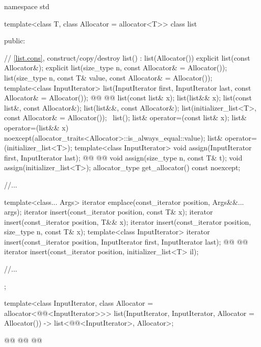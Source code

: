 \documentclass{wg21}
\begin{document}
\begin{codeblock}
namespace std {
    template<class T, class Allocator = allocator<T>>
    class list {
        public:

        // \ref{list.cons}, construct/copy/destroy
        list() : list(Allocator()) { }
        explicit list(const Allocator&);
        explicit list(size_type n, const Allocator& = Allocator());
        list(size_type n, const T& value, const Allocator& = Allocator());
        template<class InputIterator>
        list(InputIterator first, InputIterator last, const Allocator& = Allocator());
        @@
        @@
        list(const list& x);
        list(list&& x);
        list(const list&, const Allocator&);
        list(list&&, const Allocator&);
        list(initializer_list<T>, const Allocator& = Allocator());
        ~list();
        list& operator=(const list& x);
        list& operator=(list&& x)
        noexcept(allocator_traits<Allocator>::is_always_equal::value);
        list& operator=(initializer_list<T>);
        template<class InputIterator>
        void assign(InputIterator first, InputIterator last);
        @@
        @@
        void assign(size_type n, const T& t);
        void assign(initializer_list<T>);
        allocator_type get_allocator() const noexcept;

        //...

        template<class... Args> iterator emplace(const_iterator position, Args&&... args);
        iterator insert(const_iterator position, const T& x);
        iterator insert(const_iterator position, T&& x);
        iterator insert(const_iterator position, size_type n, const T& x);
        template<class InputIterator>
        iterator insert(const_iterator position, InputIterator first, InputIterator last);
        @@
        @@
        iterator insert(const_iterator position, initializer_list<T> il);

        //...
    };

    template<class InputIterator, class Allocator = allocator<@@<InputIterator>>>
    list(InputIterator, InputIterator, Allocator = Allocator())
    -> list<@@<InputIterator>, Allocator>;

    @@
    @@
    @@
}
\end{codeblock}
\end{document}

